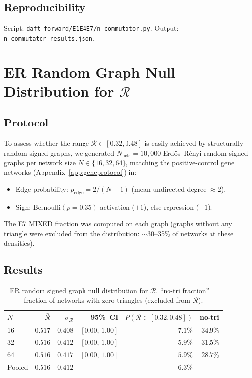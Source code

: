 \documentclass[12pt,a4paper]{article}
\newcommand{\R}{\mathcal{R}}           %
\theoremstyle{plain}
\theoremstyle{definition}
\theoremstyle{remark}
\begin{document}
\subsection*{Reproducibility}

Script: \texttt{daft-forward/E1E4E7/n\_commutator.py}.
Output: \texttt{n\_commutator\_results.json}.

\section{ER Random Graph Null Distribution for $\R$}
\label{app:null_er}

\subsection*{Protocol}

To assess whether the range $\R\in[0.32,0.48]$ is easily achieved by structurally
random signed graphs, we generated $N_\text{nets}=10{,}000$ Erd{\H o}s--R{\'e}nyi
random signed graphs per network size $N\in\{16,32,64\}$, matching the
positive-control gene networks (Appendix~\ref{app:geneprotocol}) in:
\begin{itemize}
  \item Edge probability: $p_\text{edge}=2/(N-1)$ (mean undirected degree $\approx2$).
  \item Sign: Bernoulli$(p=0.35)$ activation ($+1$), else repression ($-1$).
\end{itemize}
The E7 MIXED fraction was computed on each graph (graphs without any triangle
were excluded from the distribution: $\sim$30--35\% of networks at these densities).

\subsection*{Results}

\begin{table}[H]
\centering
\caption{ER random signed graph null distribution for $\R$.
  ``no-tri fraction'' = fraction of networks with zero triangles (excluded from $\R$).}
\label{tab:er_null}
\small
\begin{tabular}{lrrrrr}
\toprule
$N$ & $\bar{\R}$ & $\sigma_\R$ & 95\%~CI & $P(\R\in[0.32,0.48])$ & no-tri \\
\midrule
16  & $0.517$ & $0.408$ & $[0.00,\,1.00]$ & $7.1\%$ & $34.9\%$ \\
32  & $0.516$ & $0.412$ & $[0.00,\,1.00]$ & $5.9\%$ & $31.5\%$ \\
64  & $0.516$ & $0.417$ & $[0.00,\,1.00]$ & $5.9\%$ & $28.7\%$ \\
Pooled & $0.516$ & $0.412$ & $--$ & $6.3\%$ & $--$ \\
\bottomrule
\end{tabular}
\end{table}
\end{document}
